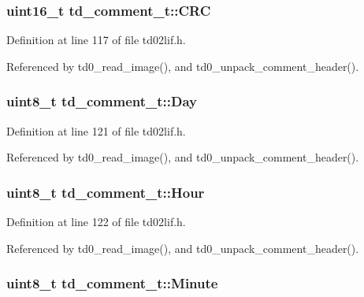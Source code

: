 \subsubsection[{\texorpdfstring{C\+RC}{CRC}}]{\setlength{\rightskip}{0pt plus 5cm}uint16\+\_\+t td\+\_\+comment\+\_\+t\+::\+C\+RC}\hypertarget{structtd__comment__t_a4bcc6435d5a4408627be9f50ef124211}{}\label{structtd__comment__t_a4bcc6435d5a4408627be9f50ef124211}


Definition at line 117 of file td02lif.\+h.



Referenced by td0\+\_\+read\+\_\+image(), and td0\+\_\+unpack\+\_\+comment\+\_\+header().

\subsubsection[{\texorpdfstring{Day}{Day}}]{\setlength{\rightskip}{0pt plus 5cm}uint8\+\_\+t td\+\_\+comment\+\_\+t\+::\+Day}\hypertarget{structtd__comment__t_ab42475ed36aa4475f76336099fd53acc}{}\label{structtd__comment__t_ab42475ed36aa4475f76336099fd53acc}


Definition at line 121 of file td02lif.\+h.



Referenced by td0\+\_\+read\+\_\+image(), and td0\+\_\+unpack\+\_\+comment\+\_\+header().

\subsubsection[{\texorpdfstring{Hour}{Hour}}]{\setlength{\rightskip}{0pt plus 5cm}uint8\+\_\+t td\+\_\+comment\+\_\+t\+::\+Hour}\hypertarget{structtd__comment__t_ae42f4895a24dadba8528e32d89d601c6}{}\label{structtd__comment__t_ae42f4895a24dadba8528e32d89d601c6}


Definition at line 122 of file td02lif.\+h.



Referenced by td0\+\_\+read\+\_\+image(), and td0\+\_\+unpack\+\_\+comment\+\_\+header().

\subsubsection[{\texorpdfstring{Minute}{Minute}}]{\setlength{\rightskip}{0pt plus 5cm}uint8\+\_\+t td\+\_\+comment\+\_\+t\+::\+Minute}\hypertarget{structtd__comment__t_a40d01b0af51b4896e0d771e8a458ed87}{}\label{structtd__comment__t_a40d01b0af51b4896e0d771e8a458ed87}


